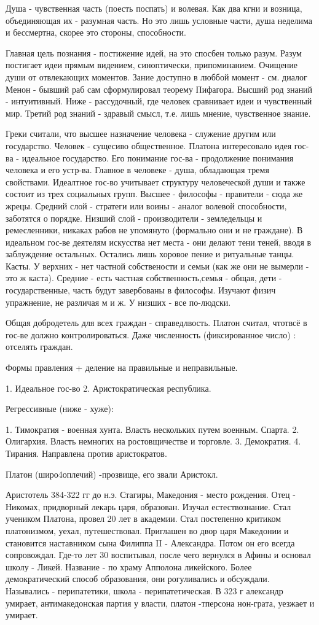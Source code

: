 Душа - чувственная часть (поесть поспать) и волевая. Как два кгни и возница, объединяющая их - разумная часть. Но это лишь условные части, душа неделима и бессмертна, скорее это стороны, способности.

Главная цель познания - постижение идей, на это спосбен только разум. Разум постигает идеи прямым видением, синоптически, припоминанием. 
Очищение души от отвлекающих моментов. Зание доступно в люббой момент - см. диалог Менон - бывший раб сам сформулировал теорему Пифагора. 
Высший род знаний - интуитивный. Ниже - рассудочный, где человек сравнивает идеи и чувственный мир. Третий род знаний - здравый смысл, т.е. лишь мнение, чувственное знание.

Греки считали, что высшее назначение человека - служение другим или государство. Человек - сущесиво общественное.
Платона интересовало идея гос-ва - идеальное государство. Его понимание гос-ва - продолжение понимания человека и его устр-ва. Главное в человеке - душа, обладающая тремя свойствами. 
Идеалтное гос-во учитывает структуру человеческой души и также состоит из трех социальных групп. Высшее - философы - правители - сюда же жрецы. Средний слой - стратеги или воины - аналог волевой способности, заботятся о порядке. 
Низший слой - производители - земледельцы и ремесленники, никаках рабов не упомянуто (формально они и не граждане). 
В идеальном гос-ве деятелям искусства нет места - они делают тени теней, вводя в заблуждение остальных. Остались лишь хоровое пение и ритуальные танцы. Касты. 
У верхних - нет частной собствености и семьи (как же они не вымерли - это ж каста). Средние - есть частная собственность,семья - общая, дети - государственные, часть будут завербованы в философы. 
Изучают физич упражнение, не различая м и ж.
У низших - все по-людски.

Общая добродетель для всех граждан - справедлвость.
Платон считал, чтотвсё в гос-ве должно контролироваться. Даже численность (фиксированное число) : отселять граждан.

Формы правления + деление на правильные и неправильные.

	1. Идеальное гос-во
	2. Аристократическая республика.

Регрессивные (ниже - хуже):

	1. Тимократия - военная хунта. Власть нескольких путем военным. Спарта.
	2. Олигархия. Власть немногих на ростовщичестве и торговле.
	3. Демократия.
	4. Тирания. Направлена против аристократов.


Платон (широ4оплечий) -прозвище, его звали Аристокл.

Аристотель
384-322 гг до н.э.
Стагиры, Македония - место рождения. Отец - Никомах, придворный лекарь царя, образован.
Изучал естествознание. Стал учеником Платона, провел 20 лет в академии. Стал постепенно критиком платонизмом, уехал, путешествовал. Приглашен во двор царя Македонии и становится наставником сына Филиппа II - Александра. 
Потом он его всегда сопровождал. Где-то лет 30 воспитывал, после чего вернулся в Афины и основал школу - Ликей. 
Название - по храму Апполона ликейского. Более демократический способ образования, они рогуливались и обсуждали. 
Назывались - перипатетики, школа - перипатетическая. В 323 г александр умирает, антимакедонская партия у власти, платон -тперсона нон-грата, уезжает и умирает.
 